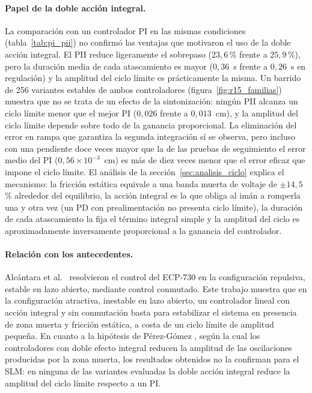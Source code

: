\paragraph{Papel de la doble acción integral.}
La comparación con un controlador PI en las mismas condiciones (tabla~\ref{tab:pi_pii}) no confirmó las ventajas que motivaron el uso de la doble acción integral. El PII reduce ligeramente el sobrepaso ($23{,}6$\,\% frente a $25{,}9$\,\%), pero la duración media de cada atascamiento es mayor ($0{,}36$~s frente a $0{,}26$~s en regulación) y la amplitud del ciclo límite es prácticamente la misma. Un barrido de 256 variantes estables de ambos controladores (figura~\ref{fig:r15_familias}) muestra que no se trata de un efecto de la sintonización: ningún PII alcanza un ciclo límite menor que el mejor PI ($0{,}026$ frente a $0{,}013$~cm), y la amplitud del ciclo límite depende sobre todo de la ganancia proporcional. La eliminación del error en rampa que garantiza la segunda integración sí se observa, pero incluso con una pendiente doce veces mayor que la de las pruebas de seguimiento el error medio del PI ($0{,}56\times10^{-3}$~cm) es más de diez veces menor que el error eficaz que impone el ciclo límite. El análisis de la sección~\ref{sec:analisis_ciclo} explica el mecanismo: la fricción estática equivale a una banda muerta de voltaje de $\pm14{,}5$\,\% alrededor del equilibrio, la acción integral es la que obliga al imán a romperla una y otra vez (un PD con prealimentación no presenta ciclo límite), la duración de cada atascamiento la fija el término integral simple y la amplitud del ciclo es aproximadamente inversamente proporcional a la ganancia del controlador.

\paragraph{Relación con los antecedentes.}
Alcántara et al.\ \cite{alcantara} resolvieron el control del ECP-730 en la configuración repulsiva, estable en lazo abierto, mediante control conmutado. Este trabajo muestra que en la configuración atractiva, inestable en lazo abierto, un controlador lineal con acción integral y sin conmutación basta para estabilizar el sistema en presencia de zona muerta y fricción estática, a costa de un ciclo límite de amplitud pequeña. En cuanto a la hipótesis de Pérez-Gómez \cite{perez}, según la cual los controladores con doble efecto integral reducen la amplitud de las oscilaciones producidas por la zona muerta, los resultados obtenidos no la confirman para el SLM: en ninguna de las variantes evaluadas la doble acción integral reduce la amplitud del ciclo límite respecto a un PI.

